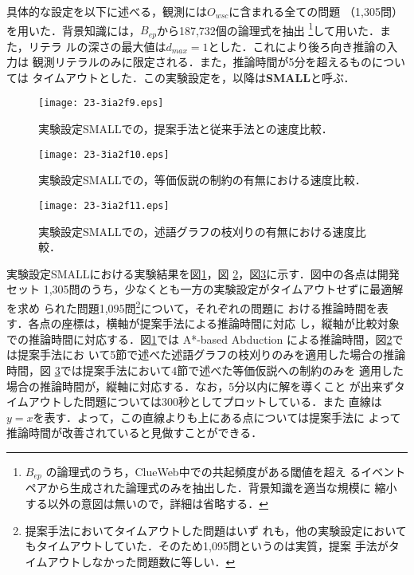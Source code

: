 \documentclass[japanese]{jnlp_1.4}
\begin{document}
具体的な設定を以下に述べる，観測には$O_\mathit{wsc}$に含まれる全ての問題
（1,305問）を用いた．背景知識には，$B_\mathit{ep}$から187,732個の論理式を抽出
\footnote{$B_\mathit{ep}$ の論理式のうち，ClueWeb中での共起頻度がある閾値を超え
るイベントペアから生成された論理式のみを抽出した．背景知識を適当な規模に
縮小する以外の意図は無いので，詳細は省略する．}して用いた．また，リテラ
ルの深さの最大値は$d_\mathit{max}=1$とした．これにより後ろ向き推論の入力は
観測リテラルのみに限定される．また，推論時間が5分を超えるものについては
タイムアウトとした．この実験設定を，以降は{\bf SMALL}と呼ぶ．

\begin{figure}[b]
\begin{center}
\texttt{[image: 23-3ia2f9.eps]}
\end{center}
\caption{実験設定SMALLでの，提案手法と従来手法との速度比較．}
\label{fig:result1}
\end{figure}

\begin{figure}[t]
\begin{center}
\texttt{[image: 23-3ia2f10.eps]}
\end{center}
\caption{実験設定SMALLでの，等価仮説の制約の有無における速度比較．}
\label{fig:result2}
\end{figure}
\begin{figure}[t]
\begin{center}
\texttt{[image: 23-3ia2f11.eps]}
\end{center}
\caption{実験設定SMALLでの，述語グラフの枝刈りの有無における速度比較．}
\label{fig:result3}
\end{figure}

実験設定SMALLにおける実験結果を図\ref{fig:result1}，図
\ref{fig:result2}，図\ref{fig:result3}に示す．図中の各点は開発セット
1,305問のうち，少なくとも一方の実験設定がタイムアウトせずに最適解を求め
られた問題1,095問\footnote{提案手法においてタイムアウトした問題はいず
れも，他の実験設定においてもタイムアウトしていた．そのため1,095問というのは実質，提案
手法がタイムアウトしなかった問題数に等しい．}について，それぞれの問題に
おける推論時間を表す．各点の座標は，横軸が提案手法による推論時間に対応
し，縦軸が比較対象での推論時間に対応する．図\ref{fig:result1}では
A*-based Abduction による推論時間，図\ref{fig:result2}では提案手法にお
いて5節で述べた述語グラフの枝刈りのみを適用した場合の推論時間，図
\ref{fig:result3}では提案手法において4節で述べた等価仮説への制約のみを
適用した場合の推論時間が，縦軸に対応する．なお，5分以内に解を導くこと
が出来ずタイムアウトした問題については300秒としてプロットしている．また
直線は$y=x$を表す．よって，この直線よりも上にある点については提案手法に
よって推論時間が改善されていると見做すことができる．
\end{document}
